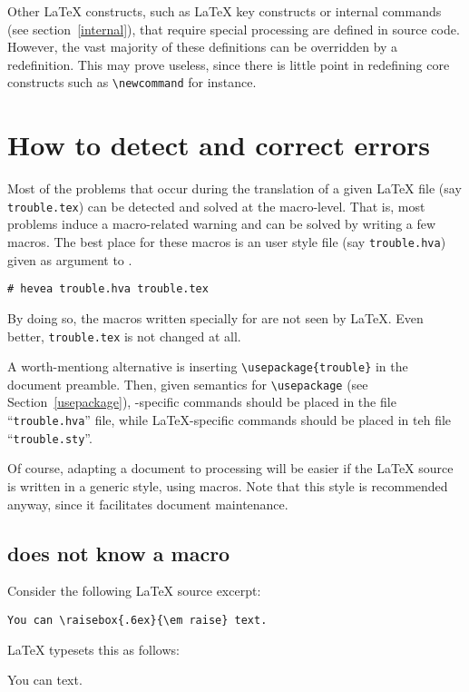 Other \LaTeX{} constructs, such as
\LaTeX{} key constructs or \hevea{} internal commands (see section~\ref{internal}),
that require special processing are defined
in \hevea{} source code.
However, the vast majority of these definitions can be overridden by a
redefinition.
This may prove useless, since there is little point in
redefining core constructs such as \verb+\newcommand+ for instance.

\section{How to detect and correct errors}\label{trouble}

Most of the problems that occur during the translation of a given
\LaTeX{} file (say \verb+trouble.tex+) can be detected and solved at
the macro-level. That is, most problems induce a macro-related warning
and can be solved by writing a few
macros. The best place for these macros is an user style file (say
\texttt{trouble.hva}) given as
argument to \hevea.
\begin{verbatim}
# hevea trouble.hva trouble.tex
\end{verbatim}
By doing so, the macros written specially for \hevea{} are not
seen by \LaTeX. Even better, \verb+trouble.tex+ is not changed
at all.

A worth-mentiong alternative is inserting \verb+\usepackage{trouble}+
in the document preamble. Then, given \hevea{} semantics for
\verb+\usepackage+ (see Section~\ref{usepackage}),
\hevea{}-specific commands should be placed in
the file ``\texttt{trouble.hva}'' file, while \LaTeX{}-specific commands
should be placed in teh file ``\texttt{trouble.sty}''.

Of course, adapting a document to \hevea{} processing
will be easier if the \LaTeX{} source is written in a
generic style, using macros.
Note that this style is recommended anyway, since it facilitates
document maintenance.

\subsection{\hevea{} does not know a macro}\label{dontknow}
Consider the following \LaTeX{} source excerpt:
\begin{verbatim}
You can \raisebox{.6ex}{\em raise} text.
\end{verbatim}

\LaTeX{} typesets this as follows:
\begin{htmlout}
\begin{showlatex}
You can \raisebox{.6ex}{\em raise} text.
\end{showlatex}
\end{htmlout}

